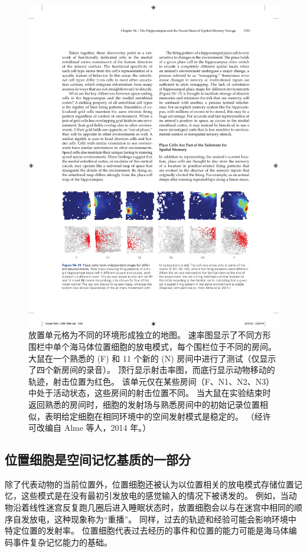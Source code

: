 \begin{figure}[htbp]
	\centering
	\includegraphics[width=0.9\linewidth]{chap54/fig_54_15}
	\caption{放置单元格为不同的环境形成独立的地图。 速率图显示了不同方形围栏中单个海马体位置细胞的放电模式，每个围栏位于不同的房间。 大鼠在一个熟悉的 (F) 和 11 个新的 (N) 房间中进行了测试（仅显示了四个新房间的录音）。 顶行显示射击率图，而底行显示动物移动的轨迹，射击位置为红色。 该单元仅在某些房间（F、N1、N2、N3）中处于活动状态，这些房间的射击位置不同。 当大鼠在实验结束时返回熟悉的房间时，细胞的发射场与熟悉房间中的初始记录位置相似，表明给定细胞在相同环境中的空间发射模式是稳定的。 （经许可改编自 Alme 等人，2014 年。）}
	\label{fig:54_15}
\end{figure}

\subsection{位置细胞是空间记忆基质的一部分}

除了代表动物的当前位置外，位置细胞还被认为以位置相关的放电模式存储位置记忆，这些模式是在没有最初引发放电的感觉输入的情况下被诱发的。 例如，当动物沿着线性迷宫反复跑几圈后进入睡眠状态时，放置细胞会以与在迷宫中相同的顺序自发放电，这种现象称为“重播”。 同样，过去的轨迹和经验可能会影响环境中特定位置的发射率。 位置细胞代表过去经历的事件和位置的能力可能是海马体编码事件复杂记忆能力的基础。

